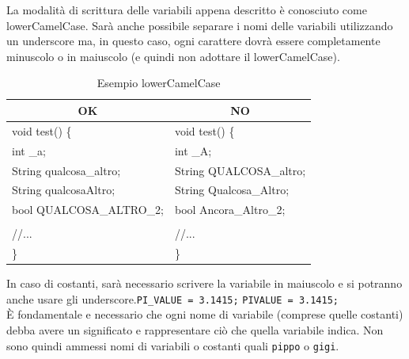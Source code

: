 La modalità di scrittura delle variabili appena descritto è conosciuto come lowerCamelCase. Sarà anche possibile separare i nomi delle variabili utilizzando un underscore ma, in questo caso, ogni carattere dovrà essere completamente minuscolo o in maiuscolo (e quindi non adottare il lowerCamelCase).\\
\begin{table} [H]
	\begin{center}
		\begin{tabular}{ | l | l |}
			\multicolumn{1}{c}{\textbf{OK}}&\multicolumn{1}{c}{\textbf{NO}}\\ 
			\hline
			void test() \{
			&void test() \{\\
			\hspace{0.5cm}int \_a;
			&\hspace{0.5cm}int \_A;\\
			\hspace{0.5cm}String qualcosa\_altro;
			&\hspace{0.5cm}String QUALCOSA\_altro;\\
			\hspace{0.5cm}String qualcosaAltro;
			&\hspace{0.5cm}String Qualcosa\_Altro;\\
			\hspace{0.5cm}bool QUALCOSA\_ALTRO\_2;
			&\hspace{0.5cm}bool Ancora\_Altro\_2;\\
			&\\
			\hspace{0.5cm}//...									&
			\hspace{0.5cm}//... \\
			\}&\}\\
			\hline
		\end{tabular}
	\end{center}
	\caption{Esempio lowerCamelCase}
\end{table}
	
In caso di costanti, sarà necessario scrivere la variabile in maiuscolo e si potranno anche usare gli underscore.\hspace{1cm}\texttt{PI\_VALUE  = 3.1415;} \hspace{0.5cm} \texttt{PIVALUE = 3.1415;}\\[0.5cm]
È fondamentale e necessario che ogni nome di variabile (comprese quelle costanti) debba avere un significato e rappresentare ciò che quella variabile indica. Non sono quindi ammessi nomi di variabili o costanti quali \texttt{pippo} o \texttt{gigi}.
